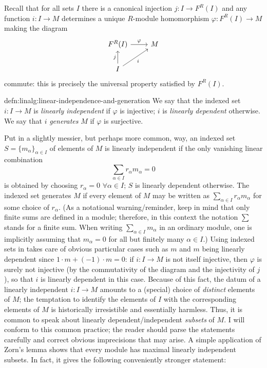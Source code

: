 Recall that for all sets $I$ there is a canonical injection
$j : I \to F^R(I)$ and any function $i : I \to M$ determines a unique
$R$-module homomorphism $\varphi : F^R(I) \to M$ making the diagram
\[\begin{tikzcd}
    F^R(I) \arrow[r, "\varphi"] & M \\
    I \arrow[u, "j"] \arrow[ur, "i"']
  \end{tikzcd}\] commute: this is precisely the universal property
satisfied by $F^R(I)$.
\begin{defn}{}{defn:linalg:linear-independence-and-generation}
  We say that the indexed set $i : I \to M$ is \emph{linearly
    independent} if $\varphi$ is injective; $i$ is \emph{linearly
    dependent} otherwise. We say that $i$ \emph{generates} $M$ if
  $\varphi$ is surjective.
\end{defn}
Put in a slightly messier, but perhaps more common, way, an indexed
set $S = \{m_\alpha\}_{\alpha \in I}$ of elements of $M$ is linearly
independent if the only vanishing linear combination
\[\sum_{\alpha \in I} r_\alpha m_\alpha = 0\]
is obtained by choosing $r_\alpha = 0$ $\forall \alpha \in I$; $S$ is
linearly dependent otherwise. The indexed set generates $M$ if every
element of $M$ may be written as
$\sum_{\alpha \in I} r_\alpha m_\alpha$ for some choice of
$r_\alpha$. (As a notational warning/reminder, keep in mind that only
finite sums are defined in a module; therefore, in this context the
notation $\sum$ stands for a finite sum. When writing
$\sum_{\alpha \in I} m_\alpha$ in an ordinary module, one is
implicitly assuming that $m_\alpha = 0$ for all but finitely many
$\alpha \in I$.)  Using indexed sets in  takes care
of obvious particular cases such as $m$ and $m$ being linearly
dependent since $1 \cdot m + (-1) \cdot m = 0$: if $i : I \to M$ is
not itself injective, then $\varphi$ is surely not injective (by the
commutativity of the diagram and the injectivity of $j$), so that $i$
is linearly dependent in this case. Because of this fact, the datum of
a linearly independent $i : I \to M$ amounts to a (special) choice of
\emph{distinct} elements of $M$; the temptation to identify the
elements of $I$ with the corresponding elements of $M$ is historically
irresistible and essentially harmless. Thus, it is common to speak
about linearly dependent/independent \emph{subsets} of $M$.  I will
conform to this common practice; the reader should parse the
statements carefully and correct obvious imprecisions that may arise.
A simple application of Zorn's lemma shows that every module has
maximal linearly independent subsets. In fact, it gives the following
conveniently stronger statement:


